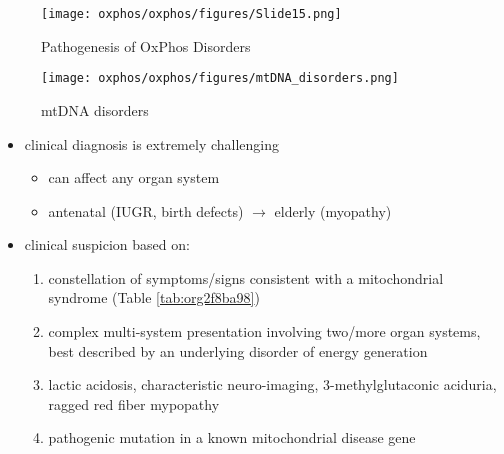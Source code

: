 \documentclass{scrartcl}
\begin{document}
\begin{figure}[htbp]
\centering
\texttt{[image: oxphos/oxphos/figures/Slide15.png]}
\caption[ETC]{\label{fig:org540e2fc}Pathogenesis of OxPhos Disorders}
\end{figure}


\begin{figure}[htbp]
\centering
\texttt{[image: oxphos/oxphos/figures/mtDNA\_disorders.png]}
\caption{\label{fig:orge528ddd}mtDNA disorders}
\end{figure}

\begin{itemize}
\item clinical diagnosis is extremely challenging
\begin{itemize}
\item can affect any organ system
\item antenatal (IUGR, birth defects) \(\to\) elderly (myopathy)
\end{itemize}

\item clinical suspicion based on:
\begin{enumerate}
\item constellation of symptoms/signs consistent with a mitochondrial syndrome (Table \ref{tab:org2f8ba98})
\item complex multi-system presentation involving two/more organ systems,
best described by an underlying disorder of energy generation
\item lactic acidosis, characteristic neuro-imaging, 3-methylglutaconic
aciduria, ragged red fiber mypopathy
\item pathogenic mutation in a known mitochondrial disease gene
\end{enumerate}
\end{itemize}
\end{document}
